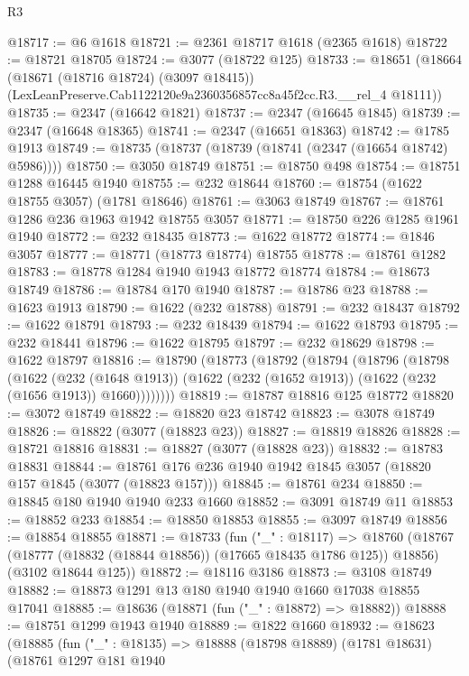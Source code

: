 \begin{lexlean}{R3}
\begin{coremodule}
@18717 := @6 @1618
@18721 := @2361 @18717 @1618 (@2365 @1618)
@18722 := @18721 @18705
@18724 := @3077 (@18722 @125)
@18733 := @18651
    (@18664
      (@18671 (@18716 @18724) (@3097 @18415))
      (LexLeanPreserve.Cab1122120e9a2360356857cc8a45f2cc.R3.__rel_4 @18111))
@18735 := @2347 (@16642 @1821)
@18737 := @2347 (@16645 @1845)
@18739 := @2347 (@16648 @18365)
@18741 := @2347 (@16651 @18363)
@18742 := @1785 @1913
@18749 := @18735 (@18737 (@18739 (@18741 (@2347 (@16654 @18742) @5986))))
@18750 := @3050 @18749
@18751 := @18750 @498
@18754 := @18751 @1288 @16445 @1940
@18755 := @232 @18644
@18760 := @18754 (@1622 @18755 @3057) (@1781 @18646)
@18761 := @3063 @18749
@18767 := @18761 @1286 @236 @1963 @1942 @18755 @3057
@18771 := @18750 @226 @1285 @1961 @1940
@18772 := @232 @18435
@18773 := @1622 @18772
@18774 := @1846 @3057
@18777 := @18771 (@18773 @18774) @18755
@18778 := @18761 @1282
@18783 := @18778 @1284 @1940 @1943 @18772 @18774
@18784 := @18673 @18749
@18786 := @18784 @170 @1940
@18787 := @18786 @23
@18788 := @1623 @1913
@18790 := @1622 (@232 @18788)
@18791 := @232 @18437
@18792 := @1622 @18791
@18793 := @232 @18439
@18794 := @1622 @18793
@18795 := @232 @18441
@18796 := @1622 @18795
@18797 := @232 @18629
@18798 := @1622 @18797
@18816 := @18790
    (@18773
      (@18792
        (@18794
          (@18796
            (@18798
              (@1622
                (@232 (@1648 @1913))
                (@1622 (@232 (@1652 @1913)) (@1622 (@232 (@1656 @1913)) @1660))))))))
@18819 := @18787 @18816 @125 @18772
@18820 := @3072 @18749
@18822 := @18820 @23 @18742
@18823 := @3078 @18749
@18826 := @18822 (@3077 (@18823 @23))
@18827 := @18819 @18826
@18828 := @18721 @18816
@18831 := @18827 (@3077 (@18828 @23))
@18832 := @18783 @18831
@18844 := @18761 @176 @236 @1940 @1942 @1845 @3057 (@18820 @157 @1845 (@3077 (@18823 @157)))
@18845 := @18761 @234
@18850 := @18845 @180 @1940 @1940 @233 @1660
@18852 := @3091 @18749 @11
@18853 := @18852 @233
@18854 := @18850 @18853
@18855 := @3097 @18749
@18856 := @18854 @18855
@18871 := @18733
    (fun ("_" : @18117) =>
    @18760
      (@18767 (@18777 (@18832 (@18844 @18856)) (@17665 @18435 @1786 @125)) @18856)
      (@3102 @18644 @125))
@18872 := @18116 @3186
@18873 := @3108 @18749
@18882 := @18873 @1291 @13 @180 @1940 @1940 @1660 @17038 @18855 @17041
@18885 := @18636 (@18871 (fun ("_" : @18872) => @18882))
@18888 := @18751 @1299 @1943 @1940
@18889 := @1822 @1660
@18932 := @18623
    (@18885
      (fun ("_" : @18135) =>
      @18888
        (@18798 @18889)
        (@1781 @18631)
        (@18761
          @1297
          @181
          @1940

\end{coremodule}
\end{lexlean}
